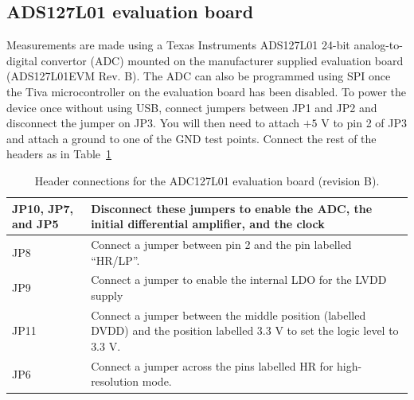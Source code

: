 \documentclass{article}
\begin{document}
\subsection{ADS127L01 evaluation board}
Measurements are made using a Texas Instruments ADS127L01 24-bit analog-to-digital convertor (ADC) mounted on the manufacturer supplied evaluation board (ADS127L01EVM Rev. B).  The ADC can also be programmed using SPI once the Tiva microcontroller on the evaluation board has been disabled.  To power the device once without using USB, connect jumpers between JP1 and JP2 and disconnect the jumper on JP3.  You will then need to attach $+5$ V to pin 2 of JP3 and attach a ground to one of the GND test points.  Connect the rest of the headers as in Table~\ref{tb:ADCJumper}
\begin{table}[htbp]
	\centering
	\begin{tabular}{|l|p{10cm}|}
		\hline
		JP10, JP7, and JP5 & Disconnect these jumpers to enable the ADC, the initial differential amplifier, and the clock\\\hline
		JP8 & Connect a jumper between pin 2 and the pin labelled ``HR/LP''.\\\hline
		JP9 & Connect a jumper to enable the internal LDO for the LVDD supply\\\hline
		JP11 & Connect a jumper between the middle position (labelled DVDD) and the position labelled 3.3 V to set the logic level to 3.3 V.\\\hline
		JP6 & Connect a jumper across the pins labelled HR for high-resolution mode.\\\hline
	\end{tabular}
	\caption{Header connections for the ADC127L01 evaluation board (revision B).}
	\label{tb:ADCJumper}
\end{table}
\end{document}
